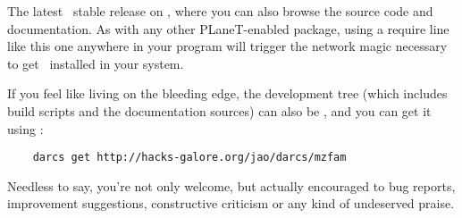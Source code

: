 The latest \MzFam\ stable release
 on ,
where you can also browse the source code and documentation. As with
any other PLaneT-enabled package, using a require line like this one
anywhere in your program will trigger the network magic necessary
to get \MzFam\ installed in your system.

If you feel like living on the bleeding edge, the development tree
(which includes build scripts and the documentation sources) can also
be , and
you can get it using :
\begin{verbatim}
    darcs get http://hacks-galore.org/jao/darcs/mzfam
\end{verbatim}

Needless to say, you're not only welcome, but actually encouraged to
 bug reports, improvement
suggestions, constructive criticism or any kind of undeserved praise.



